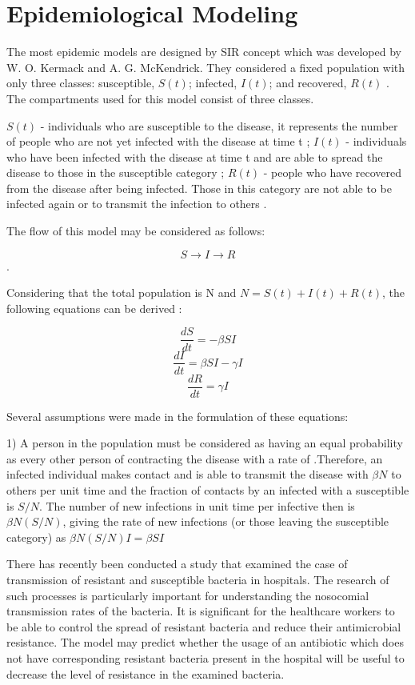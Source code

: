 \chapter*{Epidemiological Modeling}


The most epidemic models are designed by SIR concept which was developed by W. O. Kermack and A. G. McKendrick. They considered a fixed population with only three classes: susceptible, $S(t)$; infected, $I(t)$; and recovered, $R(t)$ \cite{per14}. The compartments used for this model consist of three classes.

$S(t)$ - individuals who are susceptible to the disease, it represents the number of people who are not yet infected with the disease at time t \cite{per14};
$I(t)$ - individuals who have been infected with the disease at time t and are able to spread the disease to those in the susceptible category \cite{per14};
$R(t)$ - people who have recovered from the disease after being infected. Those in this category are not able to be infected again or to transmit the infection to others \cite{per14}.

The flow of this model may be considered as follows:

$$S \rightarrow I \rightarrow R$$.

Considering that the total population is N and $N = S(t) + I(t) + R(t)$, the following equations can be derived \cite{per15}:

$$\frac{dS}{dt} = -\beta S I$$
$$\frac{dI}{dt} = \beta S I - \gamma I$$
$$\frac{dR}{dt} = \gamma I$$

Several assumptions were made in the formulation of these equations:

1) A person in the population must be considered as having an equal probability as every other person of contracting the disease with a rate of  \beta.Therefore, an infected individual makes contact and is able to transmit the disease with $\beta N$ to others per unit time and the fraction of contacts by an infected with a susceptible is $S/N$. The number of new infections in unit time per infective then is $\beta N (S/N)$, giving the rate of new infections (or those leaving the susceptible category) as $\beta N (S/N) I = \beta S I$

There has recently been conducted a study that examined the case of transmission of resistant and susceptible bacteria in hospitals. The research of such processes is particularly important for understanding the nosocomial transmission rates of the bacteria. It is significant for the healthcare workers to be able to control the spread of resistant bacteria and reduce their antimicrobial resistance. The model may predict whether the usage of an antibiotic which does not have corresponding resistant bacteria present in the hospital will be useful to decrease the level of resistance in the examined bacteria.

